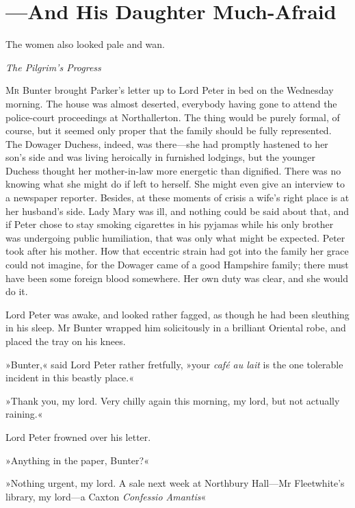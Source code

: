 
\chapter{—And His Daughter Much-Afraid}

\epigraph{The women also looked pale and wan.}{\textit{The Pilgrim's Progress}}


\lettrine[lines=4]{M}{r} Bunter brought Parker's letter up to Lord Peter in bed on the Wednesday morning. The house was almost deserted, everybody having gone to attend the police-court proceedings at Northallerton. The thing would be purely formal, of course, but it seemed only proper that the family should be fully represented. The Dowager Duchess, indeed, was there\allowbreak---\allowbreak she had promptly hastened to her son's side and was living heroically in furnished lodgings, but the younger Duchess thought her mother-in-law more energetic than dignified. There was no knowing what she might do if left to herself. She might even give an interview to a newspaper reporter. Besides, at these moments of crisis a wife's right place is at her husband's side. Lady Mary was ill, and nothing could be said about that, and if Peter chose to stay smoking cigarettes in his pyjamas while his only brother was undergoing public humiliation, that was only what might be expected. Peter took after his mother. How that eccentric strain had got into the family her grace could not imagine, for the Dowager came of a good Hampshire family; there must have been some foreign blood somewhere. Her own duty was clear, and she would do it.

Lord Peter was awake, and looked rather fagged, as though he had been sleuthing in his sleep. Mr Bunter wrapped him solicitously in a brilliant Oriental robe, and placed the tray on his knees.

»Bunter,« said Lord Peter rather fretfully, »your \textit{café au lait} is the one tolerable incident in this beastly place.«

»Thank you, my lord. Very chilly again this morning, my lord, but not actually raining.«

Lord Peter frowned over his letter.

»Anything in the paper, Bunter?«

»Nothing urgent, my lord. A sale next week at Northbury Hall\allowbreak---\allowbreak Mr  Fleetwhite's library, my lord\allowbreak---\allowbreak a Caxton \textit{Confessio Amantis}\longdash«

